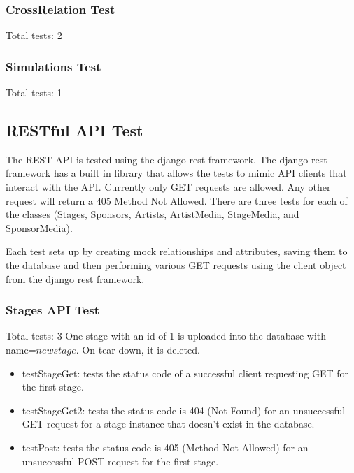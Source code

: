 \documentclass[12pt,english]{scrartcl}
\begin{document}
\subsubsection{CrossRelation Test}

Total tests: 2

\begin{itemize}

\end{itemize}

\subsubsection{Simulations Test}

Total tests: 1

\begin{itemize}

\end{itemize}


\subsection{RESTful API Test} 

The REST API is tested using the django rest framework. The django rest framework has a built in library that allows the tests to mimic API clients that interact with the API.
Currently only GET requests are allowed. Any other request will return a 405 Method Not Allowed. There are three tests for each of the 
classes (Stages, Sponsors, Artists, ArtistMedia, StageMedia, and SponsorMedia). 

Each test sets up by creating mock relationships and attributes,
saving them to the database and then performing various GET requests using the client object from the django rest framework.

\subsubsection{Stages API Test} 
Total tests: 3
One stage with an id of 1 is uploaded into the database with name=$new stage$. On tear down, it is deleted.
\begin{itemize}
 \item testStageGet: tests the status code of a successful client requesting GET for the first stage.
 
 \item testStageGet2: tests the status code is 404 (Not Found) for an unsuccessful GET request for a stage instance
 that doesn't exist in the database.
 
 \item testPost: tests the status code is 405 (Method Not Allowed) for an unsuccessful POST request for the first stage.
\end{itemize}
\end{document}
